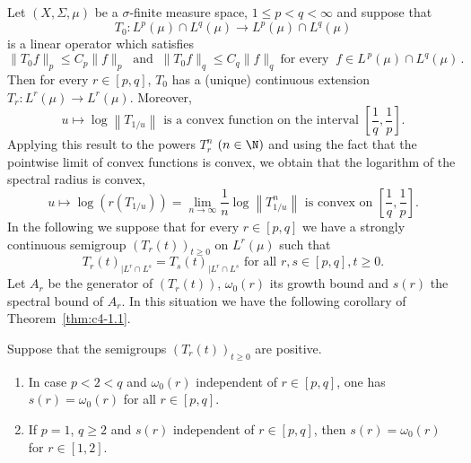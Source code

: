 Let $(X,\Sigma,\mu)$ be a $\sigma$-finite measure space, $1 \leq p < q < \infty$ and suppose that 
\[
T_{0} \colon L^{p}(\mu) \cap L^{q}(\mu) \to L^{p}(\mu) \cap L^{q}(\mu)
\]
is a linear operator which satisfies 
\[
\|T_{0}f\|_{p} \leq C_{p}\|f\|_{p} \ \text{ and } \ \|T_{0}f\|_{q} \leq C_{q}\|f\|_{q} 
\ \text{for every } \ f\in L^{\,p}(\mu) \cap L^{q}(\mu)\,.
\]
Then for every $r \in [p,q]$, $T_{0}$ has a (unique) continuous extension $T_{r} \colon L^{r}(\mu) \to L^{r}(\mu)$.
Moreover,
\begin{equation}\label{eq:c4-1.1}
u \mapsto \log\left\|T_{1/u}\right\| \text{ is a convex function on the interval } \left[\frac{1}{q},\frac{1}{p}\right].
\end{equation}
Applying this result to the powers $T_{r}^{n}$ $(n \in\N)$ and using the fact that the pointwise limit of convex functions is convex, we obtain that the logarithm of the spectral radius is convex, \ie
\begin{equation}\label{eq:c4-1.2}
u \mapsto \log(r(T_{1/u})) = \lim_{n\to\infty} \frac{1}{n}\log\left\|T_{1/u}^{n}\right\| \text{ is convex on }  \left[\frac{1}{q},\frac{1}{p}\right].
\end{equation}
In the following we suppose that for every $r \in [p,q]$ we have a strongly continuous semigroup $(T_{r}(t))_{t\geq 0}$ on $L^{r}(\mu)$ such that
\begin{equation}\label{eq:c4-1.3}
T_{r}(t)_{|L^{r} \cap L^{s}} = T_{s}(t)_{|L^{r} \cap L^{s}} \text{ for all } r,s \in [p,q], t \geq 0.
\end{equation}
Let $A_{r}$ be the generator of\/ $(T_{r}(t))$, $\omega_{0}(r)$ its growth bound and $s(r)$ the spectral bound of\/ $A_{r}$.
In this situation we have the following corollary of Theorem~\ref{thm:c4-1.1}.
\begin{corollary}\label{cor:c4-1.2}
Suppose that the semigroups $(T_{r}(t))_{t\geq 0}$ are positive.
\begin{enumerate}[\upshape(i)]
\item \label{cor:c4-1.2-1}
In case $p < 2 < q$ and $\omega_{0}(r)$ independent of\/ $r \in [p,q]$, one has $s(r) = \omega_{0}(r)$ for all $r \in [p,q]$.
\item \label{cor:c4-1.2-2}
If\/ $p = 1$, $q \geq 2$ and $s(r)$ independent of\/ $r \in [p,q]$, then $s(r) = \omega_{0}(r)$ for $r \in [1,2]$.
\end{enumerate}
\end{corollary}
